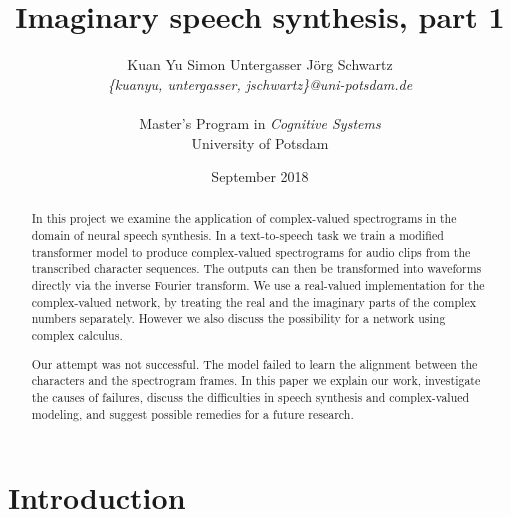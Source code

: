 \documentclass[11pt]{article}
\title{Imaginary speech synthesis, part 1}
\author{%
Kuan Yu \qquad Simon Untergasser \qquad Jörg Schwartz\\
\textit{\{kuanyu, untergasser, jschwartz\}@uni-potsdam.de}\\
\\
Master's Program in \emph{Cognitive Systems}\\
University of Potsdam}
\date{September 2018}
\begin{document}
\maketitle


\begin{abstract}
In this project we examine the application of complex-valued spectrograms
in the domain of neural speech synthesis.
In a text-to-speech task we train a modified transformer model to produce complex-valued spectrograms
for audio clips from the transcribed character sequences.
The outputs can then be transformed into waveforms directly via the inverse Fourier transform.
We use a real-valued implementation for the complex-valued network,
by treating the real and the imaginary parts of the complex numbers separately.
However we also discuss the possibility for a network using complex calculus.

Our attempt was not successful.
The model failed to learn the alignment between the characters and the spectrogram frames.
In this paper we explain our work,
investigate the causes of failures,
discuss the difficulties in speech synthesis and complex-valued modeling,
and suggest possible remedies for a future research.
\end{abstract}

\section{Introduction}
\end{document}
